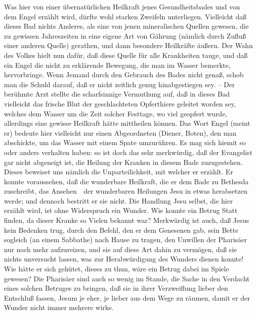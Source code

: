 \begin{aufza}
\end{aufza}\par
Was hier von einer übernatürlichen Heilkraft jenes Gesundheitsbades und von dem Engel erzählt wird, dürfte wohl starken Zweifeln unterliegen. Vielleicht daß dieses Bad nichts Anderes, als eine von jenen mineralischen Quellen gewesen, die zu gewissen Jahreszeiten in eine eigene Art von Gährung (nämlich durch Zufluß einer anderen Quelle) gerathen, und dann besondere Heilkräfte äußern. Der Wahn des Volkes hielt nun dafür, daß diese Quelle für alle Krankheiten tauge, und daß ein Engel die nicht zu erklärende Bewegung, die man im Wasser bemerkte, hervorbringe. Wenn Jemand durch den Gebrauch des Bades nicht genaß, schob man die Schuld darauf, daß er nicht zeitlich genug hinabgestiegen sey. -- Der berühmte Arzt  stellte die scharfsinnige Vermuthung auf, daß in dieses Bad vielleicht das frische Blut der geschlachteten Opferthiere geleitet worden sey, welches dem Wasser um die Zeit solcher Festtage, wo viel geopfert wurde, allerdings eine gewisse Heilkraft hätte mittheilen können. Das Wort Engel (meint er) bedeute hier vielleicht nur einen Abgeordneten (Diener, Boten), den man abschickte, um das Wasser mit einem Spate umzurühren. Es mag sich hiemit so oder anders verhalten haben: so ist doch das sehr merkwürdig, daß der Evangelist gar nicht abgeneigt ist, die Heilung der Kranken in diesem Bade zuzugestehen. Dieses beweiset uns nämlich die Unparteilichkeit, mit welcher er erzählt. Er konnte voraussehen, daß die wunderbare Heilkraft, die er dem Bade zu Bethesda zuschreibt, das Ansehen~\ der wunderbaren Heilungen Jesu in etwas herabsetzen werde; und dennoch bestritt er sie nicht. Die Handlung Jesu selbst, die hier erzählt wird, ist ohne Widerspruch ein Wunder. Wie konnte ein Betrug Statt finden, da dieser Kranke so Vielen bekannt war? Merkwürdig ist auch, daß Jesus kein Bedenken trug, durch den Befehl, den er dem Genesenen gab, sein Bette sogleich (an einem Sabbathe) nach Hause zu tragen, den Unwillen der Pharisäer nur noch mehr aufzureizen, und sie auf diese Art dahin zu vermögen, daß sie nichts unversucht lassen, was zur Herabwürdigung des Wunders dienen konnte! Wie hätte er sich gehütet, dieses zu thun, wäre ein Betrug dabei im Spiele gewesen? Die Pharisäer sind auch so wenig im Stande, die Sache in den Verdacht eines solchen Betruges zu bringen, daß sie in ihrer Verzweiflung lieber den Entschluß fassen, Jesum je eher, je lieber aus dem Wege zu räumen, damit er der Wunder nicht immer mehrere wirke.
